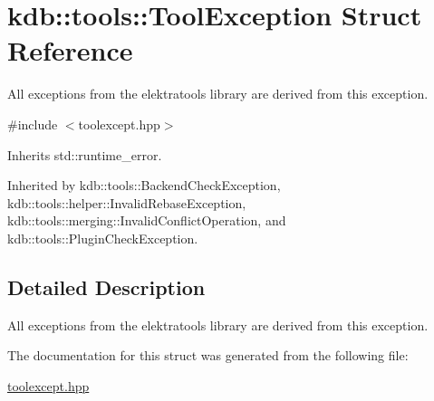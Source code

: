\hypertarget{structkdb_1_1tools_1_1ToolException}{\section{kdb\-:\-:tools\-:\-:Tool\-Exception Struct Reference}
\label{structkdb_1_1tools_1_1ToolException}
}


All exceptions from the elektratools library are derived from this exception.  




{\ttfamily \#include $<$toolexcept.\-hpp$>$}



Inherits std\-::runtime\-\_\-error.



Inherited by kdb\-::tools\-::\-Backend\-Check\-Exception, kdb\-::tools\-::helper\-::\-Invalid\-Rebase\-Exception, kdb\-::tools\-::merging\-::\-Invalid\-Conflict\-Operation, and kdb\-::tools\-::\-Plugin\-Check\-Exception.



\subsection{Detailed Description}
All exceptions from the elektratools library are derived from this exception. 

The documentation for this struct was generated from the following file\-:\begin{DoxyCompactItemize}
\item 
\hyperlink{toolexcept_8hpp}{toolexcept.\-hpp}\end{DoxyCompactItemize}
